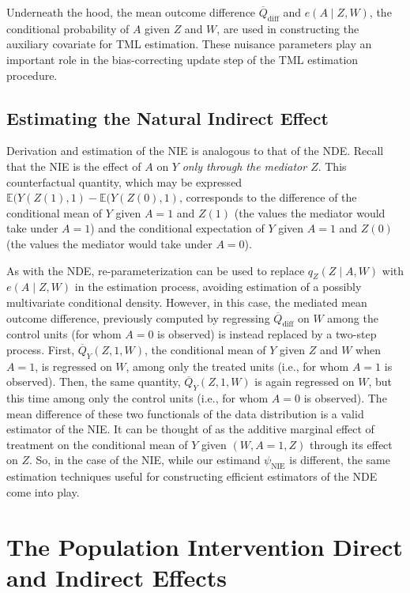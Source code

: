 \documentclass[
  12pt, krantz2,
]{krantz}
\newcommand{\E}{\mathbb{E}}
\newcommand{\1}{\mathbbm{1}}
\theoremstyle{definition}
\theoremstyle{definition}
\theoremstyle{definition}
\theoremstyle{definition}
\theoremstyle{remark}
\begin{document}
Underneath the hood, the mean outcome difference \(\overline{Q}_{\text{diff}}\)
and \(e(A \mid Z, W)\), the conditional probability of \(A\) given \(Z\) and \(W\), are
used in constructing the auxiliary covariate for TML estimation. These nuisance
parameters play an important role in the bias-correcting update step of the TML
estimation procedure.

\hypertarget{estimating-the-natural-indirect-effect}{%
\subsection{Estimating the Natural Indirect Effect}\label{estimating-the-natural-indirect-effect}}

Derivation and estimation of the NIE is analogous to that of the NDE. Recall
that the NIE is the effect of \(A\) on \(Y\) \emph{only through the mediator \(Z\)}.
This counterfactual quantity, which may be expressed \(\E(Y(Z(1), 1) - \E(Y(Z(0), 1)\), corresponds to the difference of the conditional mean of \(Y\)
given \(A = 1\) and \(Z(1)\) (the values the mediator would take under \(A = 1\)) and
the conditional expectation of \(Y\) given \(A = 1\) and \(Z(0)\) (the values the
mediator would take under \(A = 0\)).

As with the NDE, re-parameterization can be used to replace \(q_Z(Z \mid A, W)\)
with \(e(A \mid Z, W)\) in the estimation process, avoiding estimation of a
possibly multivariate conditional density. However, in this case, the mediated
mean outcome difference, previously computed by regressing
\(\overline{Q}_{\text{diff}}\) on \(W\) among the control units (for whom \(A = 0\) is
observed) is instead replaced by a two-step process. First, \(\overline{Q}_Y(Z, 1, W)\), the conditional mean of \(Y\) given \(Z\) and \(W\) when \(A = 1\), is regressed
on \(W\), among only the treated units (i.e., for whom \(A = 1\) is observed). Then,
the same quantity, \(\overline{Q}_Y(Z, 1, W)\) is again regressed on \(W\), but this
time among only the control units (i.e., for whom \(A = 0\) is observed). The mean
difference of these two functionals of the data distribution is a valid
estimator of the NIE. It can be thought of as the additive marginal effect of
treatment on the conditional mean of \(Y\) given \((W, A = 1, Z)\) through its
effect on \(Z\). So, in the case of the NIE, while our estimand
\(\psi_{\text{NIE}}\) is different, the same estimation techniques useful for
constructing efficient estimators of the NDE come into play.

\hypertarget{the-population-intervention-direct-and-indirect-effects}{%
\section{The Population Intervention Direct and Indirect Effects}\label{the-population-intervention-direct-and-indirect-effects}}
\end{document}
